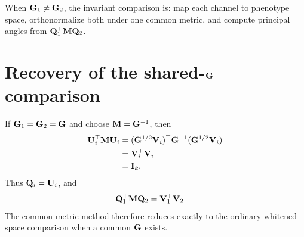 \begin{summarybox}
When \(\mathbf{G}_1\neq\mathbf{G}_2\), the invariant comparison is: map each channel to phenotype space, orthonormalize both under one common metric, and compute principal angles from \(\mathbf{Q}_1^\top\mathbf{M}\mathbf{Q}_2\).
\end{summarybox}

\section{Recovery of the shared-\(\mathbf{G}\) comparison}

If \(\mathbf{G}_1=\mathbf{G}_2=\mathbf{G}\) and choose \(\mathbf{M}=\mathbf{G}^{-1}\), then
\begin{align}
\mathbf U_i^\top\mathbf{M}\mathbf U_i
&=(\mathbf{G}^{1/2}\mathbf{V}_i)^\top\mathbf{G}^{-1}(\mathbf{G}^{1/2}\mathbf{V}_i)\\
&=\mathbf{V}_i^\top\mathbf{V}_i\\
&=\mathbf{I}_k.
\end{align}
Thus \(\mathbf{Q}_i=\mathbf U_i\), and
\begin{align}
\mathbf{Q}_1^\top\mathbf{M}\mathbf{Q}_2
&=\mathbf{V}_1^\top\mathbf{V}_2.
\end{align}
The common-metric method therefore reduces exactly to the ordinary whitened-space comparison when a common \(\mathbf{G}\) exists.
